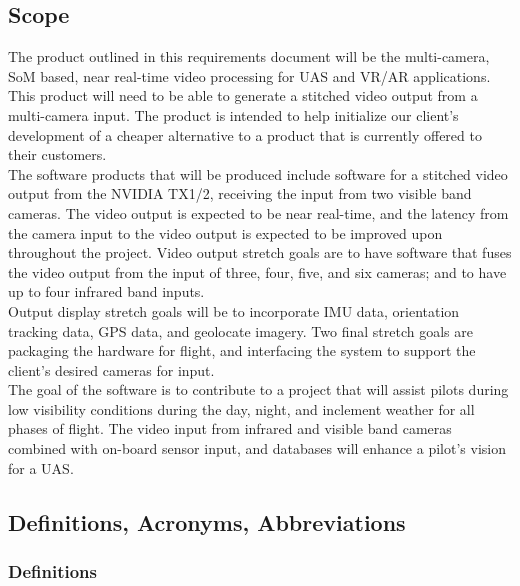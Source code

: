 \documentclass[letterpaper,10pt,serif,draftclsnofoot,onecolumn,compsoc,titlepage]{IEEEtran}
\begin{document}
\subsection{Scope}

The product outlined in this requirements document will be the multi-camera, SoM based,
 near real-time video processing for UAS and VR/AR applications. This product will need to 
 be able to generate a stitched video output from a multi-camera input. The product is 
 intended to help initialize our client's development of a cheaper alternative to a 
 product that is currently offered to their customers.\\

The software products that will be produced include software for a stitched video output 
from the NVIDIA TX1/2, receiving the input from two visible band cameras. 
The video output is expected to be near real-time, and the latency from the camera 
input to the video output is expected to be improved upon throughout the project. Video 
output stretch goals are to have software that fuses the video output from the input of 
three, four, five, and six cameras; and to have up to four infrared band inputs.\\

Output display stretch goals will be to incorporate IMU data, orientation tracking 
data, GPS data, and geolocate imagery. Two final stretch goals are packaging the 
hardware for flight, and interfacing the system to support the client's desired 
cameras for input.\\

The goal of the software is to contribute to a project that will assist pilots during 
low visibility conditions during the day, night, and inclement weather for all phases 
of flight. The video input from infrared and visible band cameras combined with 
on-board sensor input, and databases will enhance a pilot's vision for a UAS.\\

\subsection{Definitions, Acronyms, Abbreviations}

\subsubsection{Definitions}
\end{document}
